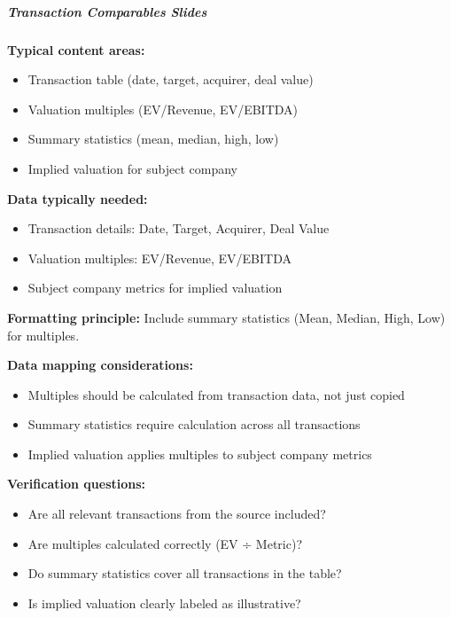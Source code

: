 \documentclass[11pt]{article}
\begin{document}
\subparagraph{Transaction Comparables Slides}\mbox{}\par

\textbf{Typical content areas:}

\begin{itemize}[leftmargin=*,itemsep=2pt,topsep=2pt]
\item {} Transaction table (date, target, acquirer, deal value)
\item {} Valuation multiples (EV/Revenue, EV/EBITDA)
\item {} Summary statistics (mean, median, high, low)
\item {} Implied valuation for subject company
\end{itemize}

\textbf{Data typically needed:}

\begin{itemize}[leftmargin=*,itemsep=2pt,topsep=2pt]
\item {} Transaction details: Date, Target, Acquirer, Deal Value
\item {} Valuation multiples: EV/Revenue, EV/EBITDA
\item {} Subject company metrics for implied valuation
\end{itemize}

\textbf{Formatting principle:} Include summary statistics (Mean, Median, High, Low) for multiples.


\textbf{Data mapping considerations:}

\begin{itemize}[leftmargin=*,itemsep=2pt,topsep=2pt]
\item {} Multiples should be calculated from transaction data, not just copied
\item {} Summary statistics require calculation across all transactions
\item {} Implied valuation applies multiples to subject company metrics
\end{itemize}

\textbf{Verification questions:}

\begin{itemize}[leftmargin=*,itemsep=2pt,topsep=2pt]
\item {} Are all relevant transactions from the source included?
\item {} Are multiples calculated correctly (EV ÷ Metric)?
\item {} Do summary statistics cover all transactions in the table?
\item {} Is implied valuation clearly labeled as illustrative?
\end{itemize}
\end{document}
